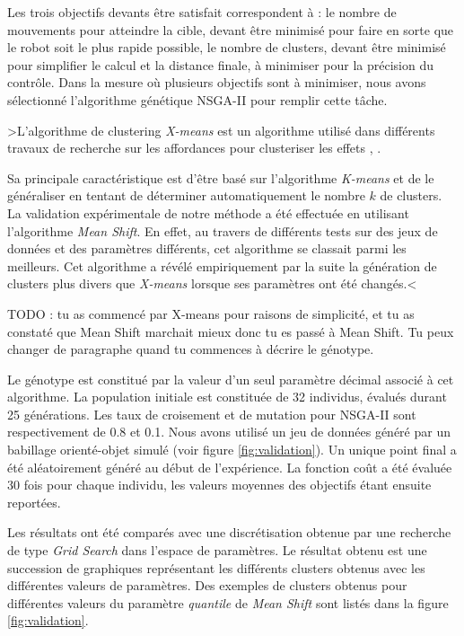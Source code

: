 \documentclass{llncs}
\newcommand*\circled[1]{\tikz[baseline=(char.base)]{\node[shape=circle,draw,inner sep=2pt] (char) {#1};}}
\begin{document}
Les trois objectifs devants être satisfait correspondent à : \circled{1} le nombre de mouvements pour atteindre la cible, devant être minimisé pour faire en sorte que le robot soit le plus rapide possible, \circled{2} le nombre de clusters, devant être minimisé pour simplifier le calcul et \circled{3} la distance finale, à minimiser pour la précision du contrôle.
Dans la mesure où plusieurs objectifs sont à minimiser, nous avons sélectionné l'algorithme génétique NSGA-II\cite{Deb:2002:FEM:2221359.2221582} pour remplir cette tâche.

>L'algorithme de clustering \textit{X-means} \cite{Pelleg2000} est un algorithme utilisé dans différents travaux de recherche sur les affordances pour clusteriser les effets \cite{Montesano2008}, \cite{Ugur2012}.

Sa principale caractéristique est d'être basé sur l'algorithme \textit{K-means} et de le généraliser en tentant de déterminer automatiquement le nombre $k$ de clusters.
La validation expérimentale de notre méthode a été effectuée en utilisant l'algorithme \textit{Mean Shift}.
En effet, au travers de différents tests sur des jeux de données et des paramètres différents, cet algorithme se classait parmi les meilleurs.
Cet algorithme a révélé empiriquement par la suite la génération de clusters plus divers que \mbox{\textit{X-means}} lorsque ses paramètres ont été changés.<

TODO : tu as commencé par X-means pour raisons de simplicité, et tu as constaté que Mean Shift marchait mieux donc tu es passé à Mean Shift. Tu peux changer de paragraphe quand tu commences à décrire le génotype.

Le génotype est constitué par la valeur d'un seul paramètre décimal associé à cet algorithme.
La population initiale est constituée de 32 individus, évalués durant 25 générations. Les taux de croisement et de mutation pour NSGA-II sont respectivement de 0.8 et 0.1. Nous avons utilisé un jeu de données généré par un babillage orienté-objet simulé (voir figure \ref{fig:validation}).
Un unique point final a été aléatoirement généré au début de l'expérience. La fonction coût a été évaluée 30 fois pour chaque individu, les valeurs moyennes des objectifs étant ensuite reportées.

Les résultats ont été comparés avec une discrétisation obtenue par une recherche de type \textit{Grid Search} dans l'espace de paramètres.
Le résultat obtenu est une succession de graphiques représentant les différents clusters obtenus avec les différentes valeurs de paramètres.
Des exemples de clusters obtenus pour différentes valeurs du paramètre \textit{quantile} de \textit{Mean Shift} sont listés dans la figure \ref{fig:validation}.
\end{document}
